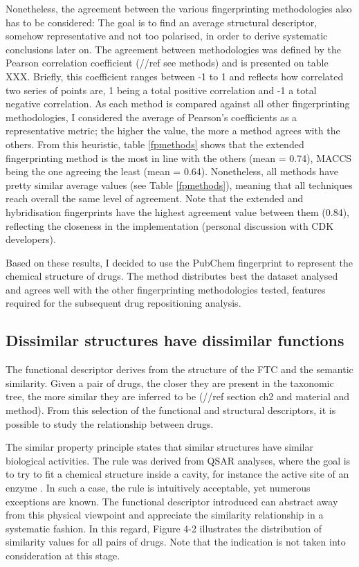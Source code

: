 Nonetheless, the agreement between the various fingerprinting methodologies also has to be considered: The goal is to find an average structural descriptor, somehow representative and not too polarised, in order to derive systematic conclusions later on. The agreement between methodologies was defined by the Pearson correlation coefficient (//ref see methods) and is presented on table XXX. Briefly, this coefficient ranges between -1 to 1 and reflects how correlated two series of points are, 1 being a total positive correlation and -1 a total negative correlation. As each method is compared against all other fingerprinting methodologies, I considered the average of Pearson’s coefficients as a representative metric; the higher the value, the more a method agrees with the others. From this heuristic, table \ref{fpmethods} shows that the extended fingerprinting method is the most in line with the others (mean = 0.74), MACCS being the one agreeing the least (mean = 0.64). Nonetheless, all methods have pretty similar average values (see Table \ref{fpmethods}), meaning that all techniques reach overall the same level of agreement. Note that the extended and hybridisation fingerprints have the highest agreement value between them (0.84), reflecting the closeness in the implementation (personal discussion with CDK developers).

Based on these results, I decided to use the PubChem fingerprint to represent the chemical structure of drugs. The method distributes best the dataset analysed and agrees well with the other fingerprinting methodologies tested, features required for the subsequent drug repositioning analysis.

\subsection{Dissimilar structures have dissimilar functions}
The functional descriptor derives from the structure of the FTC and the semantic similarity. Given a pair of drugs, the closer they are present in the taxonomic tree, the more similar they are inferred to be (//ref section ch2 and material and method). From this selection of the functional and structural descriptors, it is possible to study the relationship between drugs.

The similar property principle states that similar structures have similar biological activities. The rule was derived from QSAR analyses, where the goal is to try to fit a chemical structure inside a cavity, for instance the active site of an enzyme \citep{todeschini2009molecular}. In such a case, the rule is intuitively acceptable, yet numerous exceptions are known. The functional descriptor introduced can abstract away from this physical viewpoint and appreciate the similarity relationship in a systematic fashion. In this regard, Figure 4-2 illustrates the distribution of similarity values for all pairs of drugs. Note that the indication is not taken into consideration at this stage.

